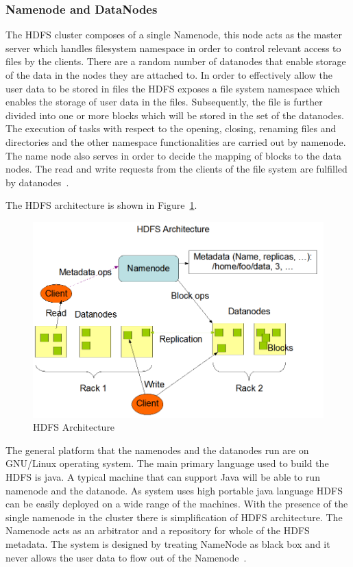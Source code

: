 \subsubsection{Namenode and DataNodes}
The HDFS cluster composes of a single Namenode, this node acts as the master 
server which handles filesystem namespace in order to control relevant access to 
files by the clients. There are a random number of datanodes that enable storage 
of the data in the nodes they are attached to. In order to effectively allow the 
user data to be stored in files the HDFS exposes a file system namespace which 
enables the storage of user data in the files. Subsequently, the file is further 
divided into one or more blocks which will be stored in the set of the 
datanodes. The execution of tasks with respect to the opening, closing, renaming 
files and directories and the other namespace functionalities are carried out by 
namenode. The name node also serves in order to decide the mapping of blocks to 
the data nodes. The read and write requests from the clients of the file system 
are fulfilled by datanodes~\cite{hid-sp18-412-HDFS-Architecture}.

The HDFS architecture is shown in Figure~\ref{s:archihdfs}.

\begin{figure}[!ht]
\centering\includegraphics[width=\textwidth]{images/HDFSarchi.png}
\caption{HDFS 
Architecture~\cite{hid-sp18-412-HDFS-Architecture}}\label{s:archihdfs}
\end{figure}

The general platform that the namenodes and the datanodes run are on GNU/Linux 
operating system. The main primary language used to build the HDFS is java. A 
typical machine that can support  Java will be able to run namenode and the 
datanode. As system uses high portable java language HDFS can be easily deployed
on a wide range of the machines. With the presence of the single namenode in the
cluster there is simplification of HDFS architecture. The Namenode acts as an 
arbitrator and a repository for whole of the HDFS metadata. The system is 
designed by treating NameNode as black box and it never allows the user data to 
flow out of the Namenode~\cite{hid-sp18-412-HDFS-Architecture}.

